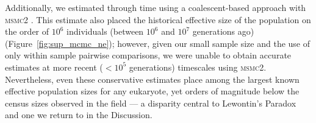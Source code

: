 Additionally, we estimated \Ne{} through time using a coalescent-based
approach with \textsc{msmc2} \citep{dutheil_msmc_2020}. This estimate also placed
the historical effective size of the population on the order of $10^{6}$ individuals
(between $10^{6}$ and $10^{7}$ generations ago) (Figure~\ref{fig:sup_mcmc_ne});
however, given our small sample size and the use of only within sample pairwise
comparisons, we were unable to obtain accurate \Ne{} estimates at more recent
($<10^{5}$ generations) timescales using \textsc{msmc2}.
Nevertheless, even these conservative estimates place \bgla{} among the
largest known effective population sizes for any eukaryote, yet orders of
magnitude below the census sizes observed in the field --- a disparity
central to Lewontin's Paradox and one we return to in the Discussion.
